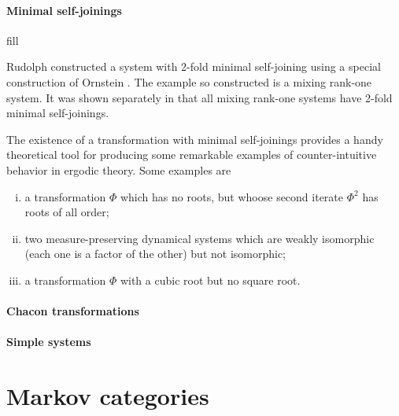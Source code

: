 \documentclass[12pt,oneside,pb-diagram]{article}
\begin{document}
\paragraph{Minimal self-joinings} fill 

Rudolph constructed a system with 2-fold minimal self-joining \cite{Rudolph1979join} using a special construction of Ornstein \cite{Ornstein1972root}. The example so constructed is a mixing rank-one system. It was shown separately in \cite{King1988join_rank} that all mixing rank-one systems have 2-fold minimal self-joinings. 

The existence of a transformation with minimal self-joinings provides a handy theoretical tool for producing some remarkable examples of counter-intuitive behavior in ergodic theory. Some examples are
\begin{enumerate} [(i)]
	\item a transformation $\Phi$ which has no roots, but whoose second iterate $\Phi^2$ has roots of all order;
	\item two measure-preserving dynamical systems which are weakly isomorphic (each one is a factor of the other) but not isomorphic;
	\item a transformation $\Phi$ with a cubic root but no square root.
\end{enumerate}

\paragraph{Chacon transformations} \cite{Chacon1969mix} \cite{DelJuncoRaheSwanson1980}

\paragraph{Simple systems} \cite{Veech1982} \cite{Thouvenot1995join} \cite{delJuncoRudolph1987self} 

\appendix
\section{Markov categories} \label{sec:app:Markov}
\end{document}
